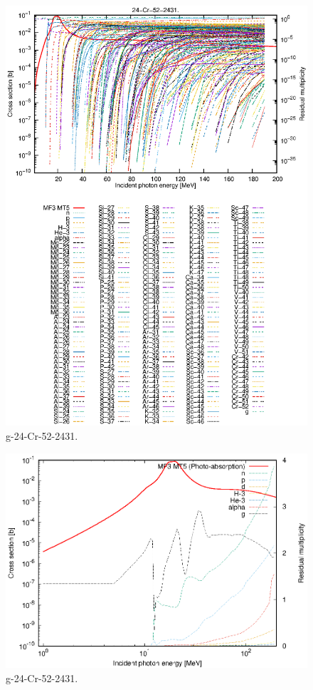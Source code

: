 \begin{figure}
 \includegraphics[width=\linewidth]{eps/g_24-Cr-52_2431.eps}
  \caption{g-24-Cr-52-2431.}
\end{figure}
\newpage \clearpage

\begin{figure}
 \includegraphics[width=\linewidth]{eps-log/g_24-Cr-52_2431.eps}
 \caption{g-24-Cr-52-2431.}
\end{figure}
\newpage \clearpage

